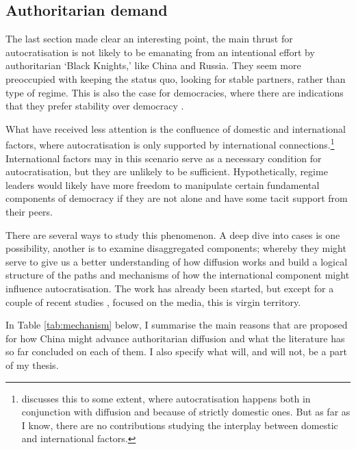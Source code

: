 \subsection{Authoritarian demand}
The last section made clear an interesting point, the main thrust for autocratisation is not likely to be emanating from an intentional effort by authoritarian `Black Knights,' like China and Russia. They seem more preoccupied with keeping the status quo, looking for stable partners, rather than type of regime. This is also the case for democracies, where there are indications that they prefer stability over democracy \citep{hassan_undermining_2015, risse_democracy_2015}.

What have received less attention is the confluence of domestic and international factors, where autocratisation is only supported by international connections.\footnote{\citet{buzogany_illiberal_2017} discusses this to some extent, where autocratisation happens both in conjunction with diffusion and because of strictly domestic ones. But as far as I know, there are no contributions studying the interplay between domestic and international factors.} International factors may in this scenario serve as a necessary condition for autocratisation, but they are unlikely to be sufficient. Hypothetically, regime leaders would likely have more freedom to manipulate certain fundamental components of democracy if they are not alone and have some tacit support from their peers. 

There are several ways to study this phenomenon. A deep dive into cases is one possibility, another is to examine disaggregated components; whereby they might serve to give us a better understanding of how diffusion works and build a logical structure of the paths and mechanisms of how the international component might influence autocratisation. The work has already been started, but except for a couple of recent studies \citep{gamso_is_2021, toettoe_foreign_2023}, focused on the media, this is virgin territory. 

In Table \ref{tab:mechanism} below, I summarise the main reasons that are proposed for how China might advance authoritarian diffusion and what the literature has so far concluded on each of them. I also specify what will, and will not, be a part of my thesis.

